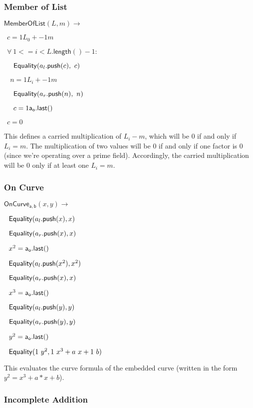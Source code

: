 \documentclass[]{article}
\begin{document}
\subsubsection{Member of List}

\newcommand{\memberlist}{\mathsf{MemberOfList}}

$\memberlist(L, m) \rightarrow$

$~~c = 1 L_0 + -1 m$

$~~\forall ~1 <= i < L\mathsf{.length}() - 1:$

$~~~~\mathsf{Equality}(a_l\mathsf{.push}(c), ~c)$

$~~~~n = 1 L_i + -1 m$

$~~~~\mathsf{Equality}(a_r\mathsf{.push}(n), ~n)$

$~~~~c = 1 \mathsf{a_o.last()}$

$~~c = 0$

This defines a carried multiplication of $L_i - m$, which will be $0$ if and only if $L_i = m$. The multiplication of two values will be $0$ if and only if one factor is $0$ (since we're operating over a prime field). Accordingly, the carried multiplication will be $0$ only if at least one $L_i = m$.

\newpage

\subsubsection{On Curve}

\newcommand{\oncurve}{\mathsf{OnCurve_{a,b}}}

$\oncurve(x, y) \rightarrow$

$~~\mathsf{Equality}(a_l\mathsf{.push}(x), x)$

$~~\mathsf{Equality}(a_r\mathsf{.push}(x), x)$

$~~x^2 = \mathsf{a_o.last()}$

$~~\mathsf{Equality}(a_l\mathsf{.push}(x^2), x^2)$

$~~\mathsf{Equality}(a_r\mathsf{.push}(x), x)$

$~~x^3 = \mathsf{a_o.last()}$

$~~\mathsf{Equality}(a_l\mathsf{.push}(y), y)$

$~~\mathsf{Equality}(a_r\mathsf{.push}(y), y)$

$~~y^2 = \mathsf{a_o.last()}$

$~~\mathsf{Equality}(1 ~y^2, 1 ~x^3 + a ~x + 1 ~b)$

This evaluates the curve formula of the embedded curve (written in the form $y^2 = x^3 + a * x + b$).

\subsubsection{Incomplete Addition}
\end{document}
